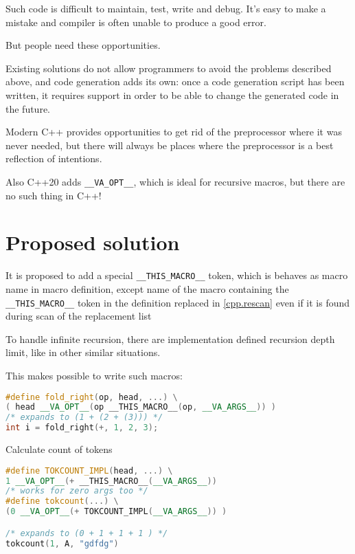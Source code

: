 \documentclass[12pt]{article}
\begin{document}
Such code is difficult to maintain, test, write and debug.
It's easy to make a mistake and compiler is often unable to produce a good error.

\medskip

But people need these opportunities.

\bigskip


Existing solutions do not allow programmers to avoid the problems described above,
and code generation adds its own: once a code generation script has been written,
it requires support in order to be able to change the generated code in the future.

\bigskip

Modern C++ provides opportunities to get rid of the preprocessor where it was never needed,
but there will always be places where the preprocessor is a best reflection of intentions.

\bigskip

Also C++20 adds \lstinline{__VA_OPT__}, which is ideal for recursive macros, but there are no such thing in C++!

\newpage

\section{Proposed solution}

It is proposed to add a special \lstinline{__THIS_MACRO__} token, which is behaves as macro name in macro definition,
except name of the macro containing the \lstinline{__THIS_MACRO__} token in the definition replaced in 
\href{https://eel.is/c++draft/cpp.rescan}{[cpp.rescan]} even if it is found during scan of the replacement list

\medskip

To handle infinite recursion, there are implementation defined recursion depth limit,
like in other similar situations.

\medskip

This makes possible to write such macros:

\begin{lstlisting}[language=C++]
#define fold_right(op, head, ...) \
( head __VA_OPT__(op __THIS_MACRO__(op, __VA_ARGS__)) )
/* expands to (1 + (2 + (3))) */
int i = fold_right(+, 1, 2, 3);
\end{lstlisting}

Calculate count of tokens
\begin{lstlisting}[language=C++]
#define TOKCOUNT_IMPL(head, ...) \
1 __VA_OPT__(+ __THIS_MACRO__(__VA_ARGS__))
/* works for zero args too */
#define tokcount(...) \
(0 __VA_OPT__(+ TOKCOUNT_IMPL(__VA_ARGS__)) )

/* expands to (0 + 1 + 1 + 1 ) */
tokcount(1, A, "gdfdg")

\end{lstlisting}
\end{document}
